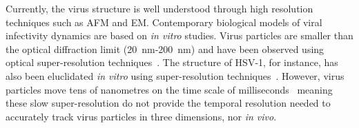 Currently, the virus structure is well understood through high resolution techniques such as \gls{AFM} and \gls{EM}.
Contemporary biological models of viral infectivity dynamics are based on \textit{in vitro} studies. %
Virus particles are smaller than the optical diffraction limit (\SI{20}{\nano\meter}-\SI{200}{\nano\meter}) and have been observed using optical super-resolution techniques~\cite{pereira_hiv_2012}.
The structure of \gls{HSV}-1, for instance, has also been eluclidated \textit{in vitro} using super-resolution techniques~\cite{laine_structural_2015}.
However, virus particles move tens of nanometres on the time scale of milliseconds~\cite{brandenburg_virus_2007} meaning these slow super-resolution do not provide the temporal resolution needed to accurately track virus particles in three dimensions, nor \textit{in vivo}.

%


